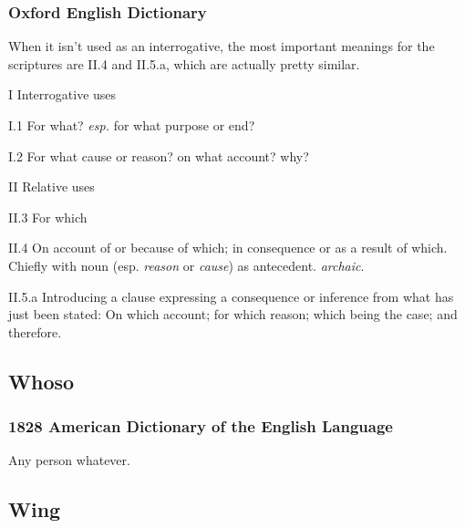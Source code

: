 		\subsubsection{Oxford English Dictionary} %
			
			When it isn't used as an interrogative, the most important meanings for the scriptures are II.4 and II.5.a, which are actually pretty similar.

			\begin{compactitem}
				\item[I] Interrogative uses
				\item[I.1] For what? \textit{esp.} for what purpose or end?
				\item[I.2] For what cause or reason? on what account? why?
				\item[II] Relative uses
				\item[II.3] For which
				\item[II.4] On account of or because of which; in consequence or as a result of which. Chiefly with noun (esp. \textit{reason} or \textit{cause}) as antecedent. \textit{archaic}.
				\item[II.5.a] Introducing a clause expressing a consequence or inference from what has just been stated: On which account; for which reason; which being the case; and therefore.
			\end{compactitem}
			
	\subsection{Whoso} %
		\label{WHOSO}
		
		\subsubsection{1828 American Dictionary of the English Language}

			\begin{compactitem}
				\item Any person whatever.
			\end{compactitem}

	\subsection{Wing} %
		\label{WING}
		
